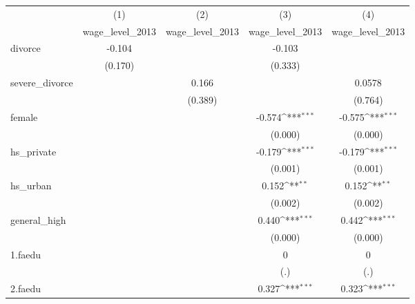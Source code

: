 {
\def\sym#1{\ifmmode^{#1}\else\(^{#1}\)\fi}
\begin{tabular}{l*{4}{c}}
\hline\hline
            &\multicolumn{1}{c}{(1)}&\multicolumn{1}{c}{(2)}&\multicolumn{1}{c}{(3)}&\multicolumn{1}{c}{(4)}\\
            &\multicolumn{1}{c}{wage\_level\_2013}&\multicolumn{1}{c}{wage\_level\_2013}&\multicolumn{1}{c}{wage\_level\_2013}&\multicolumn{1}{c}{wage\_level\_2013}\\
\hline
divorce     &      -0.104         &                     &      -0.103         &                     \\
            &     (0.170)         &                     &     (0.333)         &                     \\
[1em]
severe\_divorce&                     &       0.166         &                     &      0.0578         \\
            &                     &     (0.389)         &                     &     (0.764)         \\
[1em]
female      &                     &                     &      -0.574\sym{***}&      -0.575\sym{***}\\
            &                     &                     &     (0.000)         &     (0.000)         \\
[1em]
hs\_private  &                     &                     &      -0.179\sym{***}&      -0.179\sym{***}\\
            &                     &                     &     (0.001)         &     (0.001)         \\
[1em]
hs\_urban    &                     &                     &       0.152\sym{**} &       0.152\sym{**} \\
            &                     &                     &     (0.002)         &     (0.002)         \\
[1em]
general\_high&                     &                     &       0.440\sym{***}&       0.442\sym{***}\\
            &                     &                     &     (0.000)         &     (0.000)         \\
[1em]
1.faedu     &                     &                     &           0         &           0         \\
            &                     &                     &         (.)         &         (.)         \\
[1em]
2.faedu     &                     &                     &       0.327\sym{***}&       0.323\sym{***}\\

\end{tabular}}
